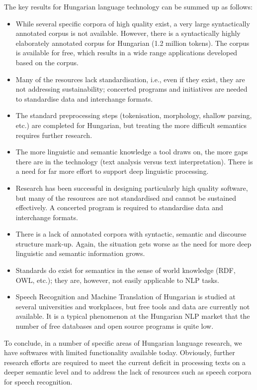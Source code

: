\begin{multicols}{2}
The key results for Hungarian language technology can be summed up as follows:

\begin{itemize}
      \item While several specific corpora of high quality exist, a very large syntactically annotated corpus is not available. However, there is a syntactically highly elaborately annotated corpus for Hungarian (1.2 million tokens). The corpus is available for free, which results in a wide range applications developed based on the corpus.
      \item Many of the resources lack standardisation, i.e., even if they exist, they are not addressing sustainability; concerted programs and initiatives are needed to standardise data and interchange formats.
      \item The standard preprocessing steps (tokenisation, morphology, shallow parsing, etc.) are completed for Hungarian, but treating the more difficult semantics requires further research. 
      \item The more linguistic and semantic knowledge a tool draws on, the more gaps there are in the technology (text analysis versus text interpretation). There is a need for far more effort to support deep linguistic processing.
      \item Research has been successful in designing particularly high quality software, but many of the resources are not standardised and cannot be sustained effectively. A concerted program is required to standardise data and interchange formats.
      \item There is a lack of annotated corpora with syntactic, semantic and discourse structure mark-up. Again, the situation gets worse as the need for more deep linguistic and semantic information grows.
      \item Standards do exist for semantics in the sense of world knowledge (RDF, OWL, etc.); they are, however, not easily applicable to NLP tasks.
      \item Speech Recognition and Machine Translation of Hungarian is studied at several universities and workplaces, but free tools and data are currently not available. It is a typical phenomenon at the Hungarian NLP market that the number of free databases and open source programs is quite low.
    \end{itemize}

To conclude, in a number of specific areas of Hungarian language research, we have softwares with limited functionality available today. Obviously, further research efforts are required to meet the current deficit in processing texts on a deeper semantic level and to address the lack of resources such as speech corpora for speech recognition.


\end{multicols}
